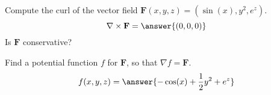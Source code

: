 \begin{problem}
Compute the curl of the vector field $\mathbf{F}(x,y,z) = (\sin(x), y^2, e^z)$.
\[
\nabla\times\mathbf{F} = \answer{(0,0,0)}
\]
Is $\mathbf{F}$ conservative?
\begin{multipleChoice}
\end{multipleChoice}
\begin{problem}
Find a potential function $f$ for $\mathbf{F}$, so that $\nabla f = \mathbf{F}$.
\[
f(x,y,z) = \answer{-\cos(x)+\frac{1}{2}y^2+e^z}
\]
\end{problem}
\end{problem}